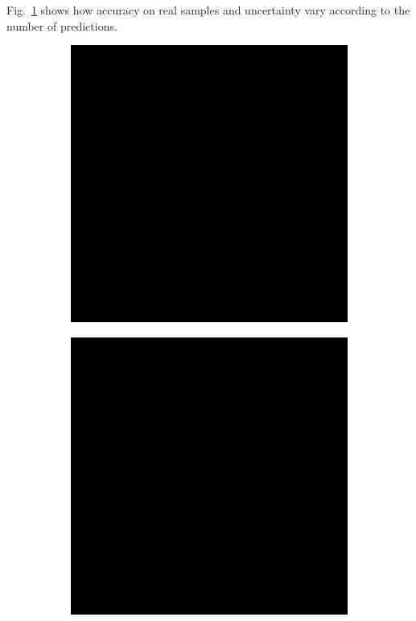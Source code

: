 \documentclass[11pt,twoside,a4paper]{article}
\begin{document}
Fig.~\ref{fig:n_preds} shows how accuracy on real samples and uncertainty vary according to the number of predictions.

\begin{figure}[!b]
    \centering
    \begin{subfigure}{0.35\textwidth}
	\includegraphics[width=\linewidth]{black.png}
        \caption{}
    \end{subfigure}
    \begin{subfigure}{0.35\textwidth}
	\includegraphics[width=\linewidth]{black.png}
        \caption{}
    \end{subfigure}
    \caption{}
    \label{fig:n_preds}
\end{figure}
\end{document}
